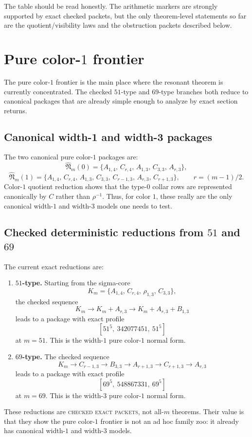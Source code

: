 \documentclass[11pt]{article}
\newcommand{\wdone}{\widehat{\mathfrak N}_m(0)}
\newcommand{\wdthree}{\widehat{\mathfrak N}_m(1)}
\newcommand{\status}[1]{\textsc{#1}}
\begin{document}
The table should be read honestly.
The arithmetic markers are strongly supported by exact checked packets, but the
only theorem-level statements so far are the quotient/visibility laws and the
obstruction packets described below.

\section{Pure color-\texorpdfstring{$1$}{1} frontier}

The pure color-$1$ frontier is the main place where the resonant theorem is
currently concentrated.
The checked $51$-type and $69$-type branches both reduce to canonical packages
that are already simple enough to analyze by exact section returns.

\subsection{Canonical width-1 and width-3 packages}

The two canonical pure color-$1$ packages are:
\[
\wdone=
\{A_{1,4},\,C_{r,4},\,A_{1,3},\,C_{3,3},\,A_{r,3}\},
\]
\[
\wdthree=
\{A_{1,4},\,C_{r,4},\,A_{1,3},\,C_{3,3},\,C_{r-1,3},\,A_{r,3},\,C_{r+1,3}\},
\qquad r=(m-1)/2.
\]
Color-$1$ quotient reduction shows that the type-$0$ collar rows are represented
canonically by $C$ rather than $\rho^{-1}$.
Thus, for color $1$, these really are the only canonical width-$1$ and width-$3$
models one needs to test.

\subsection{Checked deterministic reductions from \texorpdfstring{$51$}{51} and \texorpdfstring{$69$}{69}}

The current exact reductions are:
\begin{enumerate}[label=\textup{(\arabic*)},leftmargin=2.8em]
\item \textbf{$51$-type.}
      Starting from the sigma-core
      \[
      K_m=\{A_{1,4},\,C_{r,4},\,\rho_{1,3},\,C_{3,3}\},
      \]
      the checked sequence
      \[
      K_m\to K_m+A_{r,3}\to K_m+A_{r,3}+B_{1,3}
      \]
      leads to a package with exact profile
      \[
      [51^5,\ 342077451,\ 51^5]
      \]
      at $m=51$.
      This is the width-$1$ pure color-$1$ normal form.
\item \textbf{$69$-type.}
      The checked sequence
      \[
      K_m\to C_{r-1,3}\to B_{3,3}\to A_{r+1,3}\to C_{r+1,3}\to A_{r,3}
      \]
      leads to a package with exact profile
      \[
      [69^5,\ 548867331,\ 69^5]
      \]
      at $m=69$.
      This is the width-$3$ pure color-$1$ normal form.
\end{enumerate}
These reductions are \status{checked exact packets}, not all-$m$ theorems.
Their value is that they show the pure color-$1$ frontier is not an ad hoc
family zoo: it already has canonical width-$1$ and width-$3$ models.
\end{document}
